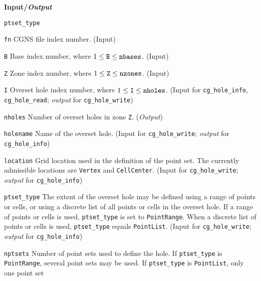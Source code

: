 \noindent
\textbf{\textcolor{input}{Input}/\textcolor{output}{\textit{Output}}}

\begin{Ventryi}{\texttt{ptset\_type}}\raggedright
\item [\texttt{fn}]
      CGNS file index number.
      (\textcolor{input}{Input})
\item [\texttt{B}]
      Base index number, where $1 \leq \text{\texttt{B}} \leq \text{\texttt{nbases}}$.
      (\textcolor{input}{Input})
\item [\texttt{Z}]
      Zone index number, where $1 \leq \text{\texttt{Z}} \leq \text{\texttt{nzones}}$.
      (\textcolor{input}{Input})
\item [\texttt{I}]
      Overset hole index number, where $1 \leq \text{\texttt{I}} \leq \text{\texttt{nholes}}$.
      (\textcolor{input}{Input} for \texttt{cg\_hole\_info},
      \texttt{cg\_hole\_read};
      \textcolor{output}{\textit{output}} for \texttt{cg\_hole\_write})
\item [\texttt{nholes}]
      Number of overset holes in zone \texttt{Z}.
      (\textcolor{output}{\textit{Output}})
\item [\texttt{holename}]
      Name of the overset hole.
      (\textcolor{input}{Input} for \texttt{cg\_hole\_write};
      \textcolor{output}{\textit{output}} for \texttt{cg\_hole\_info})
\item [\texttt{location}]
      Grid location used in the definition of the point set.
      The currently admissible locations are \texttt{Vertex} and
      \texttt{CellCenter}.
      (\textcolor{input}{Input} for \texttt{cg\_hole\_write};
      \textcolor{output}{\textit{output}} for \texttt{cg\_hole\_info})
\item [\texttt{ptset\_type}]
      The extent of the overset hole may be defined using a range of
      points or cells, or using a discrete list of all points or cells
      in the overset hole.
      If a range of points or cells is used, \texttt{ptset\_type} is set
      to \texttt{PointRange}.
      When a discrete list of points or cells is used,
      \texttt{ptset\_type} equals \texttt{PointList}.
      (\textcolor{input}{Input} for \texttt{cg\_hole\_write};
      \textcolor{output}{\textit{output}} for \texttt{cg\_hole\_info})
\item [\texttt{nptsets}]
      Number of point sets used to define the hole.
      If \texttt{ptset\_type} is \texttt{PointRange}, several point sets
      may be used.
      If \texttt{ptset\_type} is \texttt{PointList}, only one point set

\end{Ventryi}
